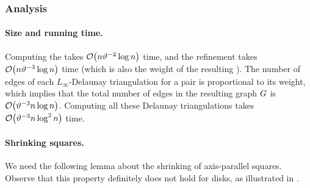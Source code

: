 \documentclass[12pt]{article}%
\begin{document}
\subsubsection{Analysis}

\paragraph{Size and running time.}

Computing the \SSPD takes $\Of\pth{n \epsA^{-2} \log n}$ time, and the
refinement takes $\Of\pth{n \epsA^{-3} \log n}$ time (which is also the
weight of the resulting \SSPD). The number of edges of each
$L_\infty$-Delaunay triangulation for a pair is proportional to its
weight, which implies that the total number of edges in the resulting
graph $G$ is $\Of\pth{ \epsA^{-3} n\log n}$. Computing all these
Delaunay triangulations takes $\Of\pth{ \epsA^{-3}n \log^2 n}$ time.


\paragraph{Shrinking squares.}
We need the following lemma about the shrinking of axis-parallel squares.
Observe that this property definitely does not hold for disks, as
illustrated in .
\end{document}
